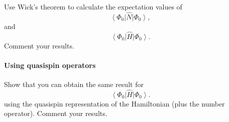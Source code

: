 \documentclass[prc]{revtex4}
\newcommand{\bra}[1]{\left\langle #1 \right|}
\newcommand{\ket}[1]{\left| #1 \right\rangle}
\begin{document}
Use Wick's theorem to calculate the expectation values of
\[
\bra{\Phi_0}\hat{N}\ket{\Phi_0},
\]
and
\[
\bra{\Phi_0}\hat{H}\ket{\Phi_0}.
\]
Comment your results.
\paragraph{Using quasispin operators}
Show that you can obtain the same result for
\[
\bra{\Phi_0}\hat{H}\ket{\Phi_0}.
\]
using the quasispin representation of the Hamiltonian (plus the number operator). 
Comment your results.
\end{document}
